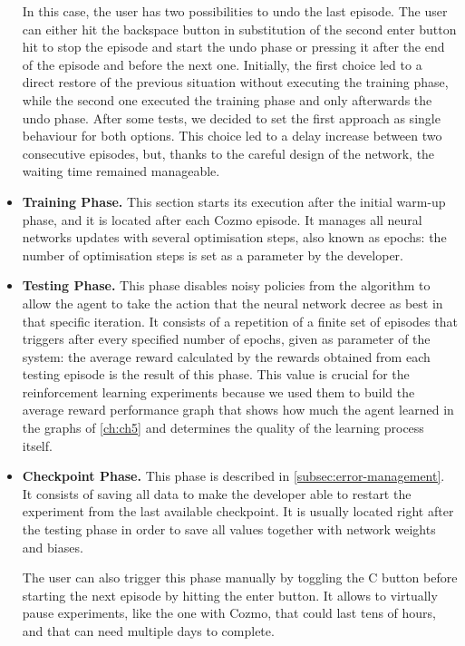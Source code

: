 \begin{itemize}
          In this case, the user has two possibilities to undo the last episode. The user can either hit the backspace button in substitution of the second enter button hit to stop the episode and start the undo phase or pressing it after the end of the episode and before the next one. Initially, the first choice led to a direct restore of the previous situation without executing the training phase, while the second one executed the training phase and only afterwards the undo phase.
          After some tests, we decided to set the first approach as single behaviour for both options.
          This choice led to a delay increase between two consecutive episodes, but, thanks to the careful design of the network, the waiting time remained manageable.
    \item \textbf{Training Phase.} This section starts its execution after the initial warm-up phase, and it is located after each Cozmo episode. It manages all neural networks updates with several optimisation steps, also known as epochs: the number of optimisation steps is set as a parameter by the developer.
    \item \textbf{Testing Phase.} This phase disables noisy policies from the algorithm to allow the agent to take the action that the neural network decree as best in that specific iteration. It consists of a repetition of a finite set of episodes that triggers after every specified number of epochs, given as parameter of the system: the average reward calculated by the rewards obtained from each testing episode is the result of this phase. This value is crucial for the reinforcement learning experiments because we used them to build the average reward performance graph that shows how much the agent learned in the graphs of \vref{ch:ch5} and determines the quality of the learning process itself.
    \item \textbf{Checkpoint Phase.} This phase is described in \vref{subsec:error-management}. It consists of saving all data to make the developer able to restart the experiment from the last available checkpoint. It is usually located right after the testing phase in order to save all values together with network weights and biases.

          The user can also trigger this phase manually by toggling the C button before starting the next episode by hitting the enter button. It allows to virtually pause experiments, like the one with Cozmo, that could last tens of hours, and that can need multiple days to complete.
\end{itemize}


